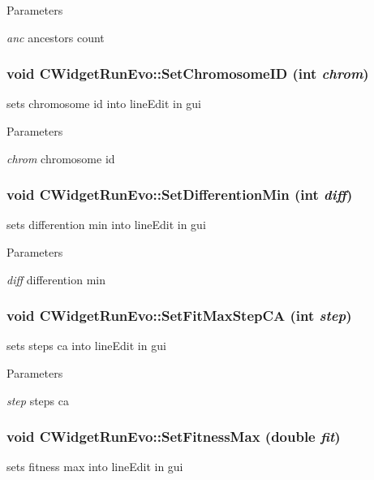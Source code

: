 \begin{DoxyParams}{Parameters}
\item[{\em anc}]ancestors count \end{DoxyParams}
\hypertarget{classCWidgetRunEvo_a211feb5cbc0aa56bf7f1fec311147e25}{
\subsubsection[{SetChromosomeID}]{\setlength{\rightskip}{0pt plus 5cm}void CWidgetRunEvo::SetChromosomeID (int {\em chrom})}}
\label{classCWidgetRunEvo_a211feb5cbc0aa56bf7f1fec311147e25}
sets chromosome id into lineEdit in gui


\begin{DoxyParams}{Parameters}
\item[{\em chrom}]chromosome id \end{DoxyParams}
\hypertarget{classCWidgetRunEvo_ae7ba5d50aef88fecebb71eee3b4ec219}{
\subsubsection[{SetDifferentionMin}]{\setlength{\rightskip}{0pt plus 5cm}void CWidgetRunEvo::SetDifferentionMin (int {\em diff})}}
\label{classCWidgetRunEvo_ae7ba5d50aef88fecebb71eee3b4ec219}
sets differention min into lineEdit in gui


\begin{DoxyParams}{Parameters}
\item[{\em diff}]differention min \end{DoxyParams}
\hypertarget{classCWidgetRunEvo_afb5f777390303f31e53c73ee79835438}{
\subsubsection[{SetFitMaxStepCA}]{\setlength{\rightskip}{0pt plus 5cm}void CWidgetRunEvo::SetFitMaxStepCA (int {\em step})}}
\label{classCWidgetRunEvo_afb5f777390303f31e53c73ee79835438}
sets steps ca into lineEdit in gui


\begin{DoxyParams}{Parameters}
\item[{\em step}]steps ca \end{DoxyParams}
\hypertarget{classCWidgetRunEvo_a7630b9619d91cc4646c271bb84381ef0}{
\subsubsection[{SetFitnessMax}]{\setlength{\rightskip}{0pt plus 5cm}void CWidgetRunEvo::SetFitnessMax (double {\em fit})}}
\label{classCWidgetRunEvo_a7630b9619d91cc4646c271bb84381ef0}
sets fitness max into lineEdit in gui


